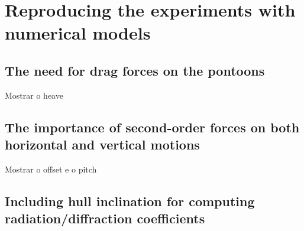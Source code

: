 \section{Reproducing the experiments with numerical models} \label{sec:exp_vs_num}

\subsection{The need for drag forces on the pontoons}
Mostrar o heave

\subsection{The importance of second-order forces on both horizontal and vertical motions}
Mostrar o offset e o pitch

\subsection{Including hull inclination for computing radiation/diffraction coefficients}